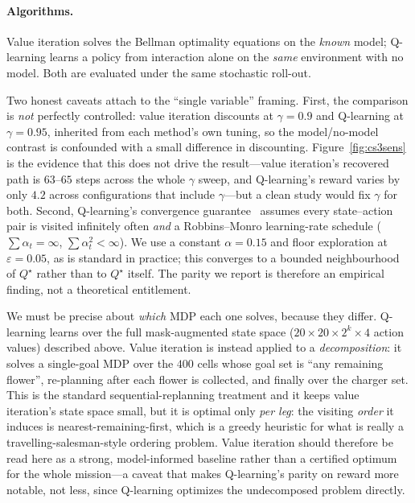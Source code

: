 \documentclass[10pt]{article}
\let\akparagraph\paragraph
\renewcommand{\paragraph}[1]{\Needspace*{4\baselineskip}\akparagraph{#1}}
\begin{document}
\paragraph{Algorithms.}
Value iteration solves the Bellman optimality equations on the \emph{known} model;
Q-learning learns a policy from interaction alone on the \emph{same} environment
with no model. Both are evaluated under the same stochastic roll-out.

Two honest caveats attach to the ``single variable'' framing. First, the
comparison is \emph{not} perfectly controlled: value iteration discounts at
$\gamma{=}0.9$ and Q-learning at $\gamma{=}0.95$, inherited from each method's own
tuning, so the model/no-model contrast is confounded with a small difference in
discounting. Figure~\ref{fig:cs3sens} is the evidence that this does not drive the
result---value iteration's recovered path is $63$--$65$ steps across the whole
$\gamma$ sweep, and Q-learning's reward varies by only $4.2$ across
configurations that include $\gamma$---but a clean study would fix $\gamma$ for
both. Second, Q-learning's convergence guarantee~\cite{watkins1992} assumes every
state--action pair is visited infinitely often \emph{and} a Robbins--Monro
learning-rate schedule ($\sum\alpha_t=\infty$, $\sum\alpha_t^2<\infty$). We use a
constant $\alpha{=}0.15$ and floor exploration at $\varepsilon{=}0.05$, as is
standard in practice; this converges to a bounded neighbourhood of $Q^{\star}$
rather than to $Q^{\star}$ itself. The parity we report is therefore an empirical
finding, not a theoretical entitlement.

We must be precise about \emph{which} MDP each one solves, because they differ.
Q-learning learns over the full mask-augmented state space
($20\times20\times2^{k}\times4$ action values) described above. Value iteration is
instead applied to a \emph{decomposition}: it solves a single-goal MDP over the
$400$ cells whose goal set is ``any remaining flower'', re-planning after each
flower is collected, and finally over the charger set. This is the standard
sequential-replanning treatment and it keeps value iteration's state space small,
but it is optimal only \emph{per leg}: the visiting \emph{order} it induces is
nearest-remaining-first, which is a greedy heuristic for what is really a
travelling-salesman-style ordering problem. Value iteration should therefore be
read here as a strong, model-informed baseline rather than a certified optimum for
the whole mission---a caveat that makes Q-learning's parity on reward more
notable, not less, since Q-learning optimizes the undecomposed problem directly.
\end{document}
